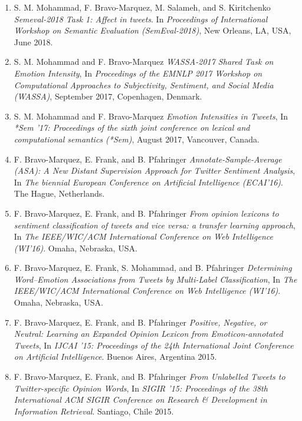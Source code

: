 \documentclass[letterpaper]{article}
\begin{document}
\begin{enumerate}

\item S. M. Mohammad, F. Bravo-Marquez, M. Salameh, and S. Kiritchenko  \textit{Semeval-2018 Task 1: Affect in tweets}. In \textit{Proceedings of International Workshop on Semantic Evaluation (SemEval-2018)}, New Orleans, LA, USA, June 2018. 

\item  S. M. Mohammad and F. Bravo-Marquez \textit{WASSA-2017 Shared Task on Emotion Intensity}, In \textit{Proceedings of the EMNLP 2017 Workshop on Computational Approaches to Subjectivity, Sentiment, and Social Media (WASSA)}, September 2017, Copenhagen, Denmark. 

\item S. M. Mohammad and F. Bravo-Marquez \textit{Emotion Intensities in Tweets}, In \textit{*Sem '17: Proceedings of the sixth joint conference on lexical and computational semantics (*Sem)}, August 2017, Vancouver, Canada. 


\item F. Bravo-Marquez, E. Frank, and B. Pfahringer \textit{Annotate-Sample-Average (ASA): A New Distant
Supervision Approach for Twitter Sentiment Analysis}, In \textit{The biennial European Conference  on Artificial Intelligence (ECAI'16)}. The Hague, Netherlands.


\item F. Bravo-Marquez, E. Frank, and B. Pfahringer \textit{From opinion lexicons to sentiment classification of
tweets and vice versa: a transfer learning approach}, In \textit{The IEEE/WIC/ACM International Conference on Web Intelligence (WI'16)}. Omaha, Nebraska, USA.


\item F. Bravo-Marquez, E. Frank, S. Mohammad, and B. Pfahringer \textit{Determining Word--Emotion Associations from Tweets by Multi-Label Classification}, In \textit{The IEEE/WIC/ACM International Conference on Web Intelligence (WI'16)}. Omaha, Nebraska, USA.

\item F. Bravo-Marquez, E. Frank, and B. Pfahringer \textit{Positive, Negative, or Neutral: Learning an Expanded Opinion Lexicon from Emoticon-annotated Tweets}, In \textit{IJCAI '15: Proceedings of the 24th International Joint Conference on Artificial Intelligence}. Buenos Aires, Argentina 2015.

\item F. Bravo-Marquez, E. Frank, and B. Pfahringer \textit{From Unlabelled Tweets to Twitter-specific Opinion Words}, In \textit{SIGIR '15: Proceedings of the 38th International ACM SIGIR Conference on Research \& Development in Information Retrieval}. Santiago, Chile 2015. 


\end{enumerate}
\end{document}
